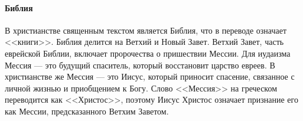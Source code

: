 \paragraph{Библия}


В христианстве священным текстом является Библия, что в переводе означает <<книги>>. Библия делится на Ветхий и Новый Завет. Ветхий Завет, часть еврейской Библии, включает пророчества о пришествии Мессии. Для иудаизма Мессия --- это будущий спаситель, который восстановит царство евреев. В христианстве же Мессия --- это Иисус, который приносит спасение, связанное с личной жизнью и приобщением к Богу. Слово <<Мессия>> на греческом переводится как <<Христос>>, поэтому Иисус Христос означает признание его как Мессии, предсказанного Ветхим Заветом.

